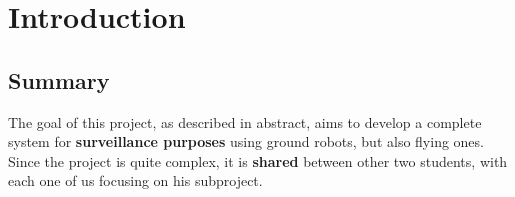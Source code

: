 \chapter{Introduction} %
\label{cha:intro}

\section{Summary}

The goal of this project, as described in abstract, aims to develop a complete system for \textbf{surveillance purposes} using ground robots, but also flying ones. Since the project is quite complex, it is \textbf{shared} between other two students, with each one of us focusing on his subproject.

\bigskip


